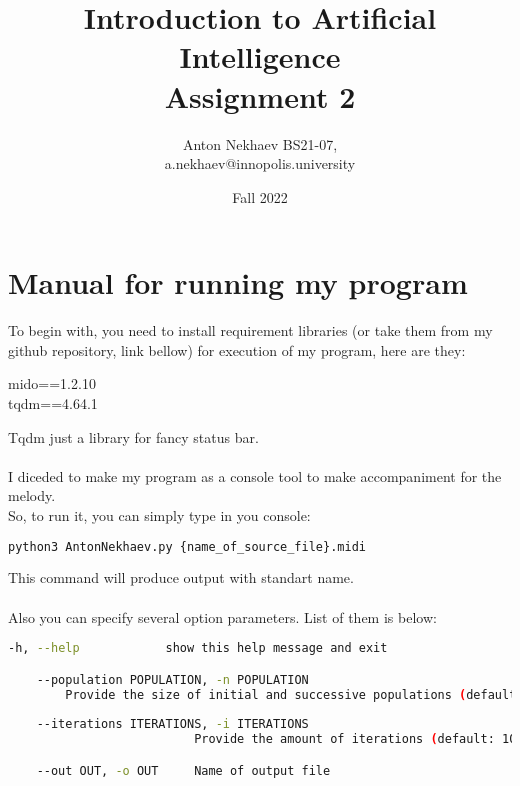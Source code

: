 \documentclass[a4paper]{article}
\title{Introduction to Artificial Intelligence \\ Assignment 2}
\author{Anton Nekhaev BS21-07, \\ a.nekhaev@innopolis.university}
\date{Fall 2022}
\begin{document}
\maketitle

\section{Manual for running my program}
To begin with, you need to install requirement libraries (or take them from my github repository, link bellow) for execution of my program, here are they:
\begin{center}
    mido==1.2.10\\
    tqdm==4.64.1
\end{center}
Tqdm just a library for fancy status bar.\\ \\
I diceded to make my program as a console tool to make accompaniment for the melody. \\
So, to run it, you can simply type in you console:
\begin{lstlisting}[language=bash]
    python3 AntonNekhaev.py {name_of_source_file}.midi
\end{lstlisting}
This command will produce output with standart name. \\
\\
Also you can specify several option parameters. List of them is below:
\begin{lstlisting}[language=bash,caption={Output of python3 AntonNekhaev.py \  -- -- help (optinal part)}]
    -h, --help            show this help message and exit

    --population POPULATION, -n POPULATION
        Provide the size of initial and successive populations (default: 600)
    
    --iterations ITERATIONS, -i ITERATIONS
                          Provide the amount of iterations (default: 100)

    --out OUT, -o OUT     Name of output file  
\end{lstlisting}
\end{document}
